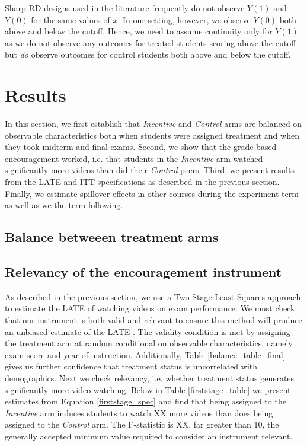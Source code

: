 \documentclass[12pt]{article}
\begin{document}
Sharp RD designs used in the literature frequently do not observe $Y(1)$ and $Y(0)$ for the same values of $x$. In our setting, however, we observe $Y(0)$ both above and below the cutoff. Hence, we need to assume continuity only for $Y(1)$ as we do not observe any outcomes for treated students scoring above the cutoff but \textit{do} observe outcomes for control students both above and below the cutoff.






\section{Results} \label{results}

In this section, we first establish that \textit{Incentive} and \textit{Control} arms are balanced on observable characteristics both when students were assigned treatment and when they took midterm and final exams. Second, we show that the grade-based encouragement worked, i.e. that students in the \textit{Incentive} arm watched significantly more videos than did their \textit{Control} peers. Third, we present results from the LATE and ITT specifications as described in the previous section. Finally, we estimate spillover effects in other courses during the experiment term as well as we the term following.

\subsection{Balance betweeen treatment arms}

\subsection{Relevancy of the encouragement instrument}

As described in the previous section, we use a Two-Stage Least Squares approach to estimate the LATE of watching videos on exam performance. We must check that our instrument is both valid and relevant to ensure this method will produce an unbiased estimate of the LATE \parencite{ir2015}. The validity condition is met by assigning the treatment arm at random conditional on observable characteristics, namely exam score and year of instruction. Additionally, Table \ref{balance_table_final} gives us further confidence that treatment status is uncorrelated with demographics. Next we check relevancy, i.e. whether treatment status generates significantly more video watching. Below in Table \ref{firststage_table} we present estimates from Equation \ref{firststage_spec} and find that being assigned to the \textit{Incentive} arm induces students to watch XX more videos than does being assigned to the \textit{Control} arm. The F-statistic is XX, far greater than 10, the generally accepted minimum value required to consider an instrument relevant.
\end{document}

